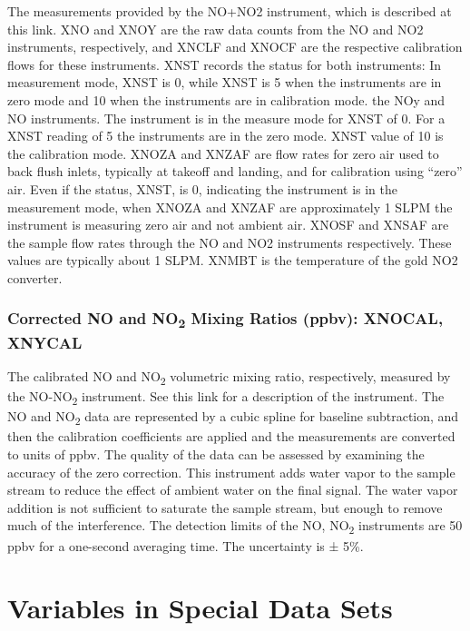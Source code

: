 \documentclass[
  english,
]{book}
\begin{document}
The measurements provided by the NO+NO{2} instrument, which is described
at this link. XNO and XNOY are the raw data counts from the NO and NO{2}
instruments, respectively, and XNCLF and XNOCF are the respective
calibration flows for these instruments. XNST records the status for
both instruments: In measurement mode, XNST is 0, while XNST is 5 when
the instruments are in zero mode and 10 when the instruments are in
calibration mode. the NOy and NO instruments. The instrument is in the
measure mode for XNST of 0. For a XNST reading of 5 the instruments are
in the zero mode. XNST value of 10 is the calibration mode. XNOZA and
XNZAF are flow rates for zero air used to back flush inlets, typically
at takeoff and landing, and for calibration using ``zero'' air. Even if
the status, XNST, is 0, indicating the instrument is in the measurement
mode, when XNOZA and XNZAF are approximately 1 SLPM the instrument is
measuring zero air and not ambient air. XNOSF and XNSAF are the sample
flow rates through the NO and NO{2} instruments respectively. These
values are typically about 1 SLPM. XNMBT is the temperature of the gold
NO{2} converter.

\hypertarget{mr-no-no2}{%
\subsubsection*{\texorpdfstring{Corrected NO and NO\textsubscript{2}
Mixing Ratios (ppbv): XNOCAL,
XNYCAL}{Corrected NO and NO2 Mixing Ratios (ppbv): XNOCAL, XNYCAL}}\label{mr-no-no2}}

The calibrated NO and NO\textsubscript{2} volumetric mixing ratio,
respectively, measured by the NO-NO\textsubscript{2} instrument. See
this link for a description of the instrument. The NO and
NO\textsubscript{2} data are represented by a cubic spline for baseline
subtraction, and then the calibration coefficients are applied and the
measurements are converted to units of ppbv. The quality of the data can
be assessed by examining the accuracy of the zero correction. This
instrument adds water vapor to the sample stream to reduce the effect of
ambient water on the final signal. The water vapor addition is not
sufficient to saturate the sample stream, but enough to remove much of
the interference. The detection limits of the NO, NO\textsubscript{2}
instruments are 50 ppbv for a one-second averaging time. The uncertainty
is {±} 5\%.

\hypertarget{awas-cims-qcls-toga}{%
\section{Variables in Special Data Sets}\label{awas-cims-qcls-toga}}
\end{document}
